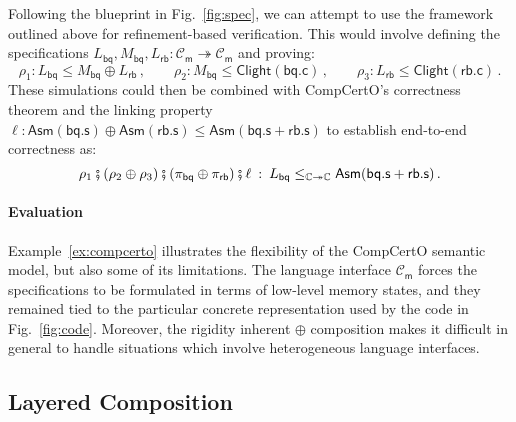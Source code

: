 \documentclass[acmsmall,screen,review,anonymous,nonacm]{acmart}
\newcommand{\kw}[1]{\ensuremath{ \mathsf{#1} }}
\newcommand{\vcomp}{\fatsemi}
\begin{document}


\begin{example} \label{ex:compcerto} %
Following the blueprint in Fig.~\ref{fig:spec},
we can attempt to use the framework outlined above
for refinement-based verification.
This would involve defining the specifications
$L_\kw{bq}, M_\kw{bq}, L_\kw{rb} :
 \mathcal{C}_\kw{m} \twoheadrightarrow \mathcal{C}_\kw{m}$
and proving:
\[
  \rho_1 :
  L_\kw{bq} \le M_\kw{bq} \oplus L_\kw{rb}
  \,, \qquad
  \rho_2 :
  M_\kw{bq} \le \kw{Clight}(\kw{bq.c})
  \,, \qquad
  \rho_3 :
  L_\kw{rb} \le \kw{Clight}(\kw{rb.c})
  \,.
\]
These simulations could then be combined with
CompCertO's correctness theorem and the linking property
$
  \ell :
    \kw{Asm}(\kw{bq.s}) \oplus \kw{Asm}(\kw{rb.s})
    \le
    \kw{Asm}(\kw{bq.s} + \kw{rb.s})
$
to establish end-to-end correctness as:
\[
  \rho_1 \vcomp (\rho_2 \oplus \rho_3) \vcomp (\pi_\kw{bq} \oplus \pi_\kw{rb}) \vcomp \ell
  \::\:
  L_\kw{bq}
    \le_{\mathbb{C} \twoheadrightarrow \mathbb{C}}
    \kw{Asm}(\kw{bq.s} + \kw{rb.s})
  \,.
\]
\end{example}

\paragraph{Evaluation} %

Example~\ref{ex:compcerto}
illustrates the flexibility of the CompCertO semantic model,
but also some of its limitations.
The language interface $\mathcal{C}_\kw{m}$
forces the specifications
to be formulated in terms of low-level memory states,
and they remained tied to the particular concrete representation
used by the code in Fig.~\ref{fig:code}.
Moreover,
the rigidity inherent $\oplus$ composition
makes it difficult in general
to handle situations which involve heterogeneous language interfaces.



\subsection{Layered Composition} \label{sec:overview:lcomp} %
\end{document}
